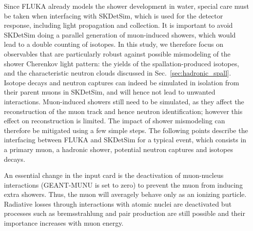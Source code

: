 Since FLUKA already models the shower development in water, special care must be taken when interfacing with SKDetSim, which is used for the detector response, including light propagation and collection. It is important to avoid SKDetSim doing a parallel generation of muon-induced showers, which would lead to a double counting of isotopes. In this study, we therefore focus on observables that are particularly robust against possible mismodeling of the shower Cherenkov light pattern: the yields of the spallation-produced isotopes, and the characteristic neutron clouds discussed in Sec.~\ref{sec:hadronic_spall}. Isotope decays and neutron captures can indeed be simulated in isolation from their parent muons in SKDetSim, and will hence not lead to unwanted interactions. Muon-induced showers still need to be simulated, as they affect the reconstruction of the muon track and hence neutron identification; however this effect on reconstruction is limited. The impact of shower mismodeling can therefore be mitigated using a few simple steps. The following points describe the interfacing between FLUKA and SKDetSim for a typical event, which consists in a  primary muon, a hadronic shower, potential neutron captures and isotopes decays.

An essential change in the input card is the deactivation of muon-nucleus interactions (GEANT-MUNU is set to zero) to prevent the muon from inducing extra showers. 
Thus, the muon will averagely behave only as an ionizing particle. Radiative losses through interactions with atomic nuclei are deactivated but processes such as bremsstrahlung and pair production are still possible and their importance increases with muon energy. 


